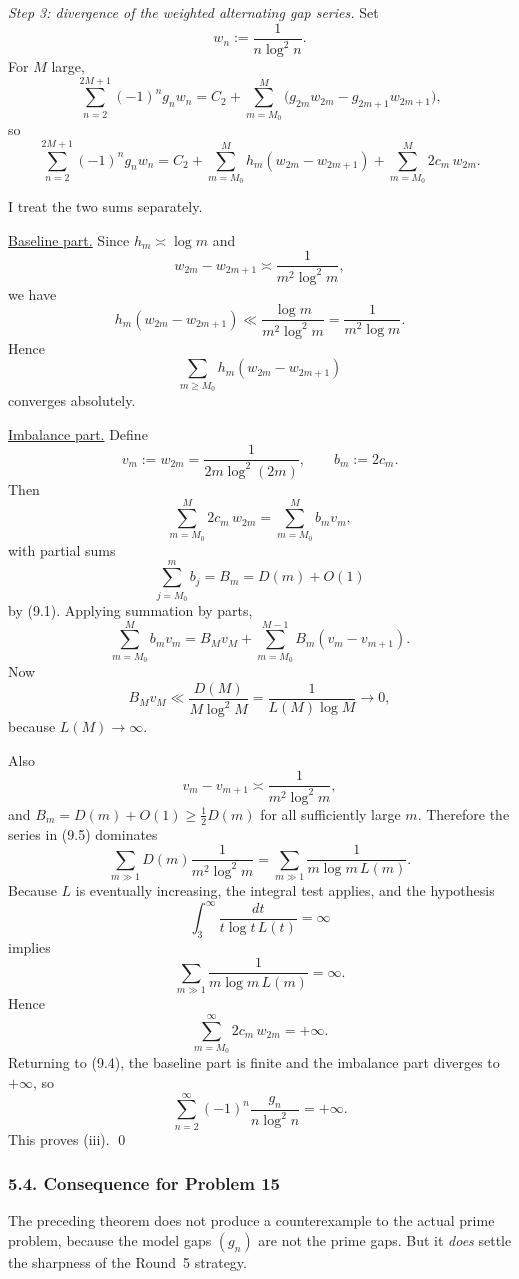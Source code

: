 \medskip

\emph{Step 3: divergence of the weighted alternating gap series.}
Set
\[
w_n:=\frac{1}{n\log^2 n}.
\]
For \(M\) large,
\[
\sum_{n=2}^{2M+1} (-1)^n g_n w_n
=
C_2 + \sum_{m=M_0}^M \bigl(g_{2m}w_{2m}-g_{2m+1}w_{2m+1}\bigr),
\]
so
\[
\sum_{n=2}^{2M+1} (-1)^n g_n w_n
=
C_2
+
\sum_{m=M_0}^M h_m(w_{2m}-w_{2m+1})
+
\sum_{m=M_0}^M 2c_m\,w_{2m}.
\tag{9.4}
\]

I treat the two sums separately.

\smallskip

\underline{Baseline part.}
Since \(h_m\asymp \log m\) and
\[
w_{2m}-w_{2m+1}\asymp \frac{1}{m^2\log^2 m},
\]
we have
\[
h_m(w_{2m}-w_{2m+1})
\ll
\frac{\log m}{m^2\log^2 m}
=
\frac{1}{m^2\log m}.
\]
Hence
\[
\sum_{m\ge M_0} h_m(w_{2m}-w_{2m+1})
\]
converges absolutely.

\smallskip

\underline{Imbalance part.}
Define
\[
v_m:=w_{2m}=\frac{1}{2m\log^2(2m)},
\qquad
b_m:=2c_m.
\]
Then
\[
\sum_{m=M_0}^M 2c_m\,w_{2m} = \sum_{m=M_0}^M b_m v_m,
\]
with partial sums
\[
\sum_{j=M_0}^m b_j = B_m = D(m)+O(1)
\]
by (9.1).
Applying summation by parts,
\[
\sum_{m=M_0}^M b_m v_m
=
B_M v_M + \sum_{m=M_0}^{M-1} B_m(v_m-v_{m+1}).
\tag{9.5}
\]
Now
\[
B_M v_M
\ll
\frac{D(M)}{M\log^2 M}
=
\frac{1}{L(M)\log M}
\to 0,
\]
because \(L(M)\to\infty\).

Also
\[
v_m-v_{m+1}\asymp \frac{1}{m^2\log^2 m},
\]
and \(B_m=D(m)+O(1)\ge \tfrac12 D(m)\) for all sufficiently large \(m\).
Therefore the series in (9.5) dominates
\[
\sum_{m\gg 1} D(m)\frac{1}{m^2\log^2 m}
=
\sum_{m\gg 1}\frac{1}{m\log m\,L(m)}.
\]
Because \(L\) is eventually increasing, the integral test applies, and the hypothesis
\[
\int_3^\infty \frac{dt}{t\log t\,L(t)}=\infty
\]
implies
\[
\sum_{m\gg 1}\frac{1}{m\log m\,L(m)}=\infty.
\]
Hence
\[
\sum_{m=M_0}^\infty 2c_m\,w_{2m} = +\infty.
\]
Returning to (9.4), the baseline part is finite and the imbalance part diverges to \(+\infty\), so
\[
\sum_{n=2}^\infty (-1)^n \frac{g_n}{n\log^2 n}=+\infty.
\]
This proves (iii). \qed

\subsubsection*{5.4. Consequence for Problem 15}

The preceding theorem does not produce a counterexample to the actual prime problem, because the model gaps \((g_n)\) are not the prime gaps.
But it \emph{does} settle the sharpness of the Round~5 strategy.

